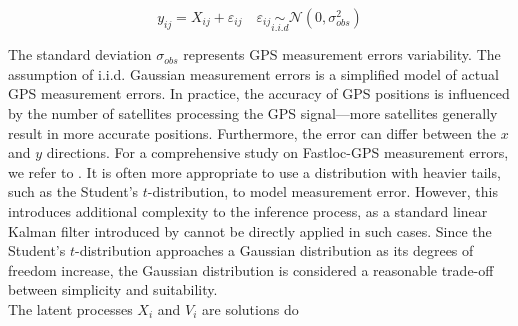 \documentclass[aoas]{imsart}
\theoremstyle{definition}
\theoremstyle{remark}
\theoremstyle{remark}
\newcommand {\1}{\mathbb{1}}
\begin{document}
\begin{equation}
	y_{ij}=X_{ij}+\varepsilon_{ij} \quad 
	\varepsilon_{ij} \underset{i.i.d}{\sim} \mathcal{N}(0,\sigma_{obs}^2)  
	\label{eq: baseline observations}
\end{equation}

The standard deviation $\sigma_{obs}$ represents GPS measurement errors variability. The assumption of i.i.d. Gaussian measurement errors is a simplified model of actual GPS measurement errors. In practice, the accuracy of GPS positions is influenced by the number of satellites processing the GPS signal—more satellites generally result in more accurate positions. Furthermore, the error can differ between the $x$ and $y$ directions. For a comprehensive study on Fastloc-GPS measurement errors, we refer to \cite{wensveen_path_2015}. It is often more appropriate to use a distribution with heavier tails, such as the Student's $t$-distribution, to model measurement error. However, this introduces additional complexity to the inference process, as a standard linear Kalman filter introduced by \cite{johnson_continuous_2008}
cannot be directly applied in such cases. Since the Student's $t$-distribution approaches a Gaussian distribution as its degrees of freedom increase, the Gaussian distribution is considered a reasonable trade-off between simplicity and suitability.\\

The latent processes $X_i$ and $V_i$ are solutions do
\end{document}
